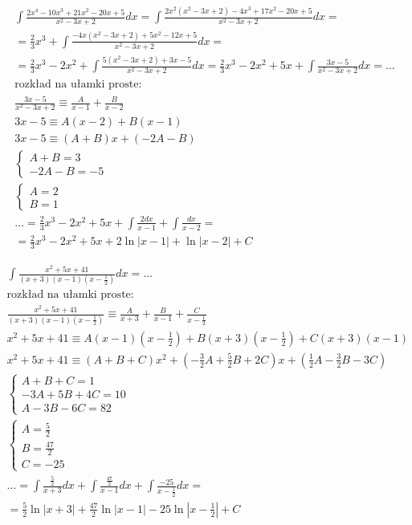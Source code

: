 
\begin{gather*}
  \int \frac{2x^4-10x^3+21x^2-20x+5}{x^2-3x+2}dx
  = \int \frac{2x^2(x^2-3x+2)-4x^3+17x^2-20x+5}{x^2-3x+2}dx = \\
  = \frac{2}{3}x^3 + \int \frac{-4x(x^2-3x+2)+5x^2-12x+5}{x^2-3x+2}dx = \\
  = \frac{2}{3}x^3-2x^2+\int \frac{5(x^2-3x+2)+3x-5}{x^2-3x+2}dx
  = \frac{2}{3}x^3-2x^2+5x+\int \frac{3x-5}{x^2-3x+2}dx = \ldots \\
  \text{rozkład na ułamki proste:} \\
  \frac{3x-5}{x^2-3x+2} \equiv \frac{A}{x-1}+\frac{B}{x-2} \\
  3x-5 \equiv A(x-2)+B(x-1) \\
  3x-5 \equiv (A+B)x+(-2A-B) \\
  \begin{cases} A+B=3 \\ -2A-B=-5 \end{cases} \\
  \begin{cases} A=2 \\ B=1 \end{cases} \\
  \ldots = \frac{2}{3}x^3-2x^2+5x+\int \frac{2dx}{x-1}+\int \frac{dx}{x-2} = \\
= \frac{2}{3}x^3-2x^2+5x+2\ln|x-1|+\ln|x-2|+C\end{gather*}



\begin{gather*}
  \int \frac{x^2+5x+41}{(x+3)(x-1)(x-\frac{1}{2})}dx = \ldots \\
  \text{rozkład na ułamki proste:} \\
  \frac{x^2+5x+41}{(x+3)(x-1)(x-\frac{1}{2})} \equiv \frac{A}{x+3}+\frac{B}{x-1}+\frac{C}{x-\frac{1}{2}} \\
  x^2+5x+41 \equiv A(x-1)(x-\frac{1}{2})+B(x+3)(x-\frac{1}{2})+C(x+3)(x-1) \\
  x^2+5x+41 \equiv (A+B+C)x^2+(-\frac{3}{2}A+\frac{5}{2}B+2C)x+(\frac{1}{2}A-\frac{3}{2}B-3 C) \\
  \begin{cases} A+B+C=1 \\ -3A+5B+4C=10 \\ A-3B-6C=82 \end{cases} \\
  \begin{cases} A=\frac{5}{2} \\ B=\frac{47}{2} \\ C=-25 \end{cases} \\
  \ldots = \int \frac{\frac{5}{2}}{x+3}dx + \int \frac{\frac{47}{2}}{x-1}dx + \int \frac{-25}{x-\frac{1}{2}}dx = \\
= \frac{5}{2}\ln|x+3|+\frac{47}{2}\ln|x-1|-25\ln|x-\frac{1}{2}|+C\end{gather*}


